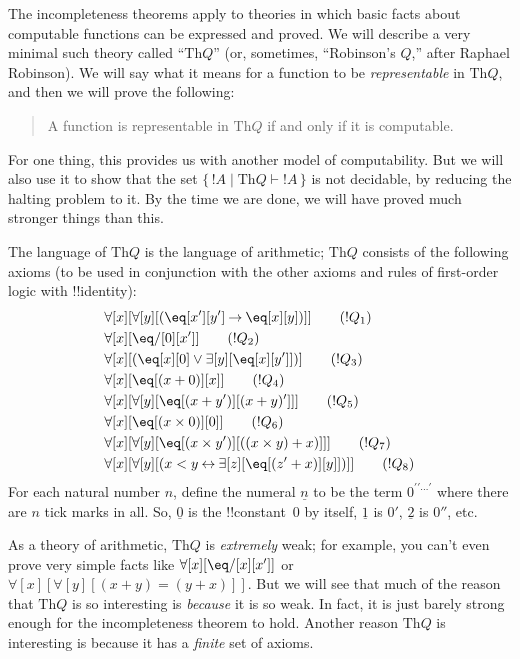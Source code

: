 \documentclass[10pt,a4paper]{article}
\theoremstyle{plain}
\theoremstyle{definition}
\theoremstyle{remark}
\providecommand{\lif}{\mathbin{\rightarrow}}
\providecommand{\lforall}{\mathord{\forall}}
\providecommand{\lexists}{\mathord{\exists}}
\providecommand{\Proves}{\mathrel{\vdash}}
\providecommand{\Obj}{}
\providecommand{\Th}{\ensuremath{\mathrm{Th}}}
\providecommand{\num}[1]{\underline{#1}}
\providecommand{\Setabs}[2]{\{\, #1 \mid #2 \,\}}
\providecommand{\liff}{\mathbin{\leftrightarrow}}
\begin{document}
The incompleteness theorems apply to theories in which basic facts
about computable functions can be expressed and proved.  We will
describe a very minimal such theory called ``$\Th{Q}$'' (or, sometimes,
``Robinson's $Q$,'' after Raphael Robinson). We will say what it means
for a function to be \emph{representable} in $\Th{Q}$, and then we
will prove the following:
\begin{quote}
  A function is representable in $\Th{Q}$ if and only if it is computable.
\end{quote}
For one thing, this provides us with another model of
computability. But we will also use it to show that the set
$\Setabs{!A}{\Th{Q} \Proves !A}$ is not decidable, by reducing the
halting problem to it. By the time we are done, we will have proved
much stronger things than this.

The language of $\Th{Q}$ is the language of
arithmetic; $\Th{Q}$ consists of the following axioms
(to be used in conjunction with the other axioms and rules of
first-order logic with !!{identity}):
\begin{align*}
& \lforall[x][\lforall[y][(\eq[x'][y'] \lif \eq[x][y])]] \tag{$!Q_1$}\\
& \lforall[x][\eq/[\Obj 0][x']] \tag{$!Q_2$}\\
& \lforall[x][(\eq[x][\Obj 0] \lor \lexists[y][\eq[x][y']])] \tag{$!Q_3$}\\
& \lforall[x][\eq[(x + \Obj 0)][x]] \tag{$!Q_4$}\\
& \lforall[x][\lforall[y][\eq[(x + y')][(x + y)']]] \tag{$!Q_5$}\\
& \lforall[x][\eq[(x \times \Obj 0)][\Obj 0]] \tag{$!Q_6$}\\
& \lforall[x][\lforall[y][\eq[(x \times y')][((x \times y) + x)]]] \tag{$!Q_7$}\\
& \lforall[x][\lforall[y][(x < y \liff \lexists[z][\eq[(z' + x)][y]])]] \tag{$!Q_8$}
\end{align*}
For each natural number $n$, define the numeral $\num{n}$ to be the
term $\Obj{0}^{\prime\prime\ldots\prime}$ where there are $n$ tick marks in
all.  So, $\num{0}$ is the !!{constant}~$\Obj{0}$ by itself, $\num{1}$
is $\Obj{0}'$, $\num{2}$ is $\Obj{0}''$, etc.

As a theory of arithmetic, $\Th{Q}$ is \emph{extremely} weak; for
example, you can't even prove very simple facts like
$\lforall[x][\eq/[x][x']]$ or $\lforall[x][\lforall[y][(x + y) = (y +
    x)]]$. But we will see that much of the reason that $\Th{Q}$ is so
interesting is \emph{because} it is so weak. In fact, it is just
barely strong enough for the incompleteness theorem to hold. Another
reason $\Th{Q}$ is interesting is because it has a \emph{finite} set
of axioms.
\end{document}
